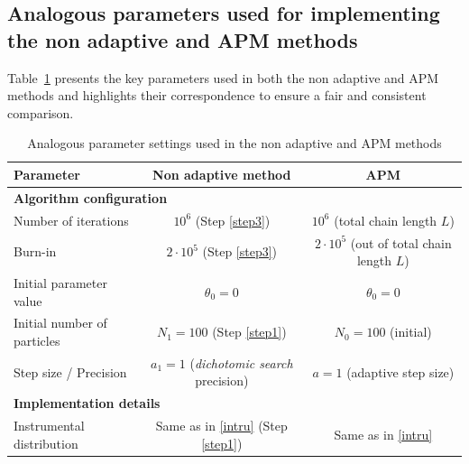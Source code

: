 \documentclass[pdflatex,sn-mathphys-num]{sn-jnl}
\theoremstyle{thmstyleone}
\theoremstyle{thmstyletwo}
\theoremstyle{thmstylethree}
\begin{document}
\subsection{Analogous parameters used for implementing the non adaptive and APM methods}
\label{appendixD2}
Table~\ref{tab:method_comparison} presents the key parameters used in both the non adaptive and APM methods and highlights their correspondence to ensure a fair and consistent comparison.

\begin{table}[h]
\caption{Analogous parameter settings used in the non adaptive and APM methods}
    \centering
    \renewcommand{\arraystretch}{1.3}
    \begin{tabular}{l|c|c}
        \textbf{Parameter} & \textbf{Non adaptive method} & \textbf{APM} \\
        \hline
        \multicolumn{3}{l}{\textbf{Algorithm configuration}} \\
        \hline
        Number of iterations & $10^6$ (Step \ref{step3}) & $10^6$ (total chain length $L$) \\
        Burn-in & $2\cdot10^5$ (Step \ref{step3}) & $2\cdot10^5$ (out of total chain length $L$) \\
        Initial parameter value & $\theta_0 = 0$ & $\theta_0 = 0$ \\
        Initial number of particles & $N_1 = 100$ (Step \ref{step1}) & $N_0 = 100$ (initial) \\
        Step size / Precision & $a_1 = 1$ (\textit{dichotomic search} precision) & $a = 1$ (adaptive step size) \\
        \hline
        \multicolumn{3}{l}{\textbf{Implementation details}} \\
        \hline
        Instrumental distribution & Same as in \eqref{intru} (Step \ref{step1}) & Same as in \eqref{intru}\\
    \end{tabular}
    \label{tab:method_comparison}
\end{table}
\end{document}
